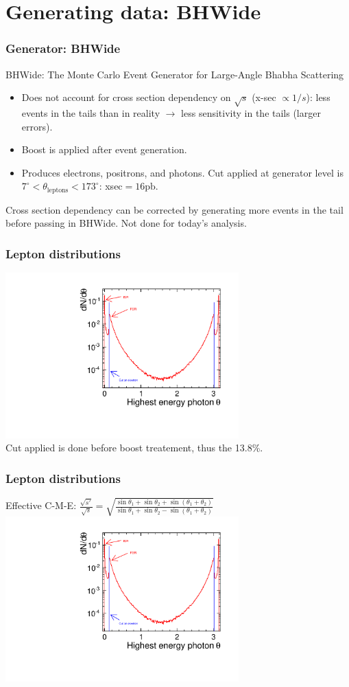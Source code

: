 \documentclass{beamer}
\begin{document}
\section{Generating data: BHWide}
\begin{frame}
\frametitle{Generator: BHWide}
BHWide: The Monte Carlo Event Generator for Large-Angle Bhabha Scattering
\begin{itemize}
  \item Does not account for cross section dependency on $\sqrt{s}$ 
  (x-sec $\propto 1/s$): less events in the tails than in reality
  $\to$ less sensitivity in the tails (larger errors).
  \item Boost is applied after event generation.
  \item Produces electrons, positrons, and photons. \alert{Cut applied at
  generator level is  $7^\circ<\theta_{\textrm{leptons}}<173^\circ$}:
  xsec$=16\textrm{pb}$.
\end{itemize}
Cross section dependency can be corrected by generating more events in the tail before passing in BHWide.
Not done for today's analysis.
\end{frame}
\begin{frame}
\frametitle{Lepton distributions}
\includegraphics[width=9cm,page=7]{BHWideAnalysis.pdf}\\
Cut applied is done before boost treatement, thus the 13.8\%.
\end{frame}
\begin{frame}
\frametitle{Lepton distributions}
Effective C-M-E:
$\frac{\sqrt{s'}}{\sqrt{s}}=\sqrt{\frac{\sin\theta_1+\sin\theta_2+\sin(\theta_1+\theta_2)}{\sin\theta_1+\sin\theta_2-\sin(\theta_1+\theta_2)}}$\\
\includegraphics[width=9cm,page=8]{BHWideAnalysis.pdf}
\end{frame}
\end{document}
